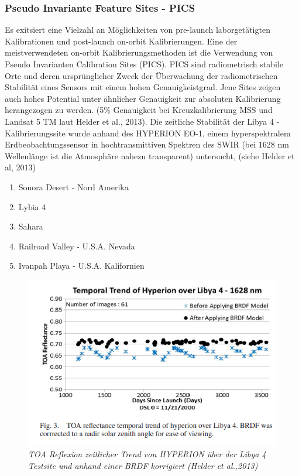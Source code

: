 \documentclass[11pt]{report}
\begin{document}
\subsubsection{Pseudo Invariante Feature Sites - PICS}
Es exitsiert eine Vielzahl an Möglichkeiten von pre-launch laborgetätigten Kalibrationen und post-launch on-orbit Kalibrierungen. Eine der meistverwendeten on-orbit Kalibrierungsmethoden ist die Verwendung von Pseudo Invarianten Calibration Sites (PICS). PICS sind radiometrisch stabile Orte und deren ursprünglicher Zweck der Überwachung der radiometrischen Stabilität eines Sensors mit einem hohen Genauigkeistgrad. Jene Sites zeigen auch hohes Potential unter ähnlicher Genauigkeit zur absoluten Kalibrierung herangezogen zu werden. (5\% Genauigkeit bei Kreuzkalibrierung MSS und Landsat 5 TM laut  Helder et al., 2013). Die zeitliche Stabilität der Libya 4 - Kalibrierungssite wurde anhand des HYPERION EO-1, einem hyperspektralem Erdbeobachtungssensor in hochtransmittiven Spektren des SWIR (bei 1628 nm Wellenlänge ist die Atmosphäre nahezu transparent) untersucht, (siehe Helder et al, 2013)

\begin{enumerate}
\item Sonora Desert - Nord Amerika
\item Lybia 4
\item Sahara
\item Railroad Valley - U.S.A. Nevada
\item Ivanpah Playa - U.S.A. Kalifornien
\end{enumerate}

\begin{figure}[H]
\centering
\includegraphics[scale=0.6]{./Grafiken/Abscal/zeitlStabilitaetLybia4_inkl_BRDF.PNG}
\caption{\textit{TOA Reflexion zeitlicher Trend von HYPERION über der Libya 4 Testsite und anhand einer BRDF korrigiert (Helder et al.,2013)}}
\end{figure}
\end{document}
